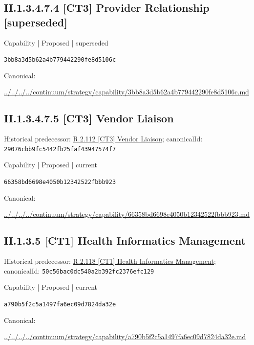\documentclass[10pt,a4paper]{article}
\begin{document}
\subsection*{II.1.3.4.7.4 [CT3] Provider Relationship [superseded]}
\label{element-3bb8a3d5b62a4b779442290fe8d5106c}
{\small Capability | Proposed | superseded}\par
\texttt{3bb8a3d5b62a4b779442290fe8d5106c}\par
Canonical: \par
{\footnotesize\url{../../../../continuum/strategy/capability/3bb8a3d5b62a4b779442290fe8d5106c.md}}\par
\subsection*{II.1.3.4.7.5 [CT3] Vendor Liaison}
Historical predecessor: \hyperref[element-29076cbb9fc5442fb25faf43947574f7]{R.2.112 [CT3] Vendor Liaison}; canonicalId: \texttt{29076cbb9fc5442fb25faf43947574f7}\par
\label{element-66358bd6698e4050b12342522fbbb923}
{\small Capability | Proposed | current}\par
\texttt{66358bd6698e4050b12342522fbbb923}\par
Canonical: \par
{\footnotesize\url{../../../../continuum/strategy/capability/66358bd6698e4050b12342522fbbb923.md}}\par
\subsection*{II.1.3.5 [CT1] Health Informatics Management}
Historical predecessor: \hyperref[element-50c56bac0dc540a2b392fc2376efc129]{R.2.118 [CT1] Health Informatics Management}; canonicalId: \texttt{50c56bac0dc540a2b392fc2376efc129}\par
\label{element-a790b5f2c5a1497fa6ec09d7824da32e}
{\small Capability | Proposed | current}\par
\texttt{a790b5f2c5a1497fa6ec09d7824da32e}\par
Canonical: \par
{\footnotesize\url{../../../../continuum/strategy/capability/a790b5f2c5a1497fa6ec09d7824da32e.md}}\par
\end{document}
